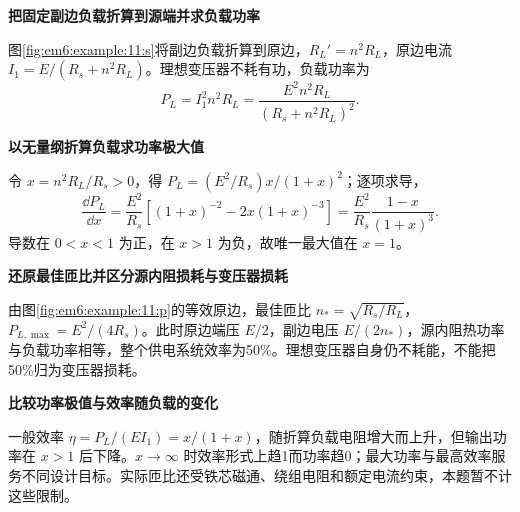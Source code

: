 \begin{solution}\textbf{把固定副边负载折算到源端并求负载功率}\par\nobreak
图\ref{fig:em6:example:11:s}将副边负载折算到原边，$R_L'=n^2R_L$，原边电流 $I_1=E/(R_s+n^2R_L)$。理想变压器不耗有功，负载功率为
\[P_L=I_1^2n^2R_L=\frac{E^2n^2R_L}{(R_s+n^2R_L)^2}.\]


\par\medskip{}\noindent\textbf{以无量纲折算负载求功率极大值}\par\nobreak
令 $x=n^2R_L/R_s>0$，得 $P_L=(E^2/R_s)x/(1+x)^2$；逐项求导，
\[
 \frac{\dd P_L}{\dd x}=\frac{E^2}{R_s}
 \left[(1+x)^{-2}-2x(1+x)^{-3}\right]
 =\frac{E^2}{R_s}\frac{1-x}{(1+x)^3}.
\]
导数在 $0<x<1$ 为正，在 $x>1$ 为负，故唯一最大值在 $x=1$。



\par\medskip{}\noindent\textbf{还原最佳匝比并区分源内阻损耗与变压器损耗}\par\nobreak
由图\ref{fig:em6:example:11:p}的等效原边，最佳匝比 $n_*=\sqrt{R_s/R_L}$，$P_{L,\max}=E^2/(4R_s)$。此时原边端压 $E/2$，副边电压 $E/(2n_*)$，源内阻热功率与负载功率相等，整个供电系统效率为50\%。理想变压器自身仍不耗能，不能把50\%归为变压器损耗。



\par\medskip{}\noindent\textbf{比较功率极值与效率随负载的变化}\par\nobreak
一般效率 $\eta=P_L/(EI_1)=x/(1+x)$，随折算负载电阻增大而上升，但输出功率在 $x>1$ 后下降。$x\to\infty$ 时效率形式上趋1而功率趋0；最大功率与最高效率服务不同设计目标。实际匝比还受铁芯磁通、绕组电阻和额定电流约束，本题暂不计这些限制。\end{solution}
